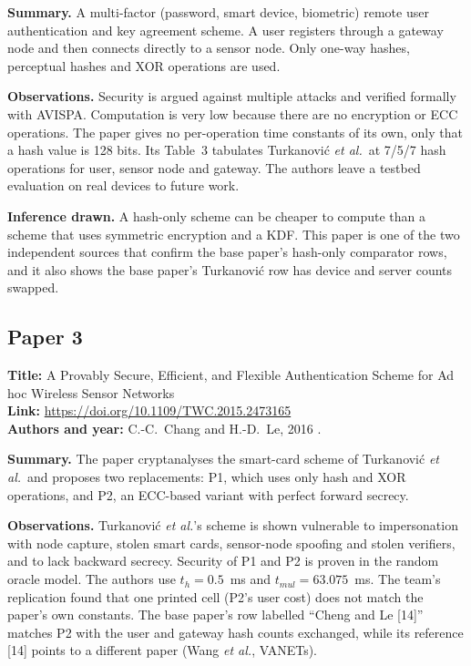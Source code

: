 \documentclass[12pt,a4paper,oneside]{report}
\numberwithin{equation}{chapter}
\begin{document}
\noindent\textbf{Summary.} A multi-factor (password, smart device, biometric) remote user authentication and key agreement scheme. A user registers through a gateway node and then connects directly to a sensor node. Only one-way hashes, perceptual hashes and XOR operations are used.

\noindent\textbf{Observations.} Security is argued against multiple attacks and verified formally with AVISPA. Computation is very low because there are no encryption or ECC operations. The paper gives no per-operation time constants of its own, only that a hash value is 128 bits. Its Table~3 tabulates Turkanovi\'{c} \emph{et al.}\ at 7/5/7 hash operations for user, sensor node and gateway. The authors leave a testbed evaluation on real devices to future work.

\noindent\textbf{Inference drawn.} A hash-only scheme can be cheaper to compute than a scheme that uses symmetric encryption and a KDF. This paper is one of the two independent sources that confirm the base paper's hash-only comparator rows, and it also shows the base paper's Turkanovi\'{c} row has device and server counts swapped.

\subsection*{Paper 3}
\noindent\textbf{Title:} A Provably Secure, Efficient, and Flexible Authentication Scheme for Ad hoc Wireless Sensor Networks\\
\textbf{Link:} \url{https://doi.org/10.1109/TWC.2015.2473165}\\
\textbf{Authors and year:} C.-C.~Chang and H.-D.~Le, 2016 \cite{chang2016provably}.

\noindent\textbf{Summary.} The paper cryptanalyses the smart-card scheme of Turkanovi\'{c} \emph{et al.}\ and proposes two replacements: P1, which uses only hash and XOR operations, and P2, an ECC-based variant with perfect forward secrecy.

\noindent\textbf{Observations.} Turkanovi\'{c} \emph{et al.}'s scheme is shown vulnerable to impersonation with node capture, stolen smart cards, sensor-node spoofing and stolen verifiers, and to lack backward secrecy. Security of P1 and P2 is proven in the random oracle model. The authors use $t_h = 0.5$~ms and $t_{mul} = 63.075$~ms. The team's replication found that one printed cell (P2's user cost) does not match the paper's own constants. The base paper's row labelled ``Cheng and Le [14]'' matches P2 with the user and gateway hash counts exchanged, while its reference [14] points to a different paper (Wang \emph{et al.}, VANETs).
\end{document}
